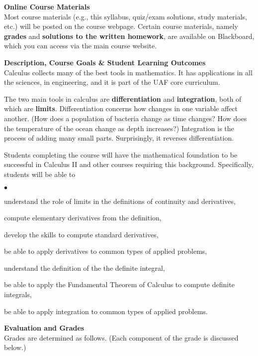 \documentclass[12pt]{article}
\renewcommand{\emph}[1]{\textsf{\textbf{#1}}}
\newcommand{\localhead}[1]{\par\smallskip\textbf{#1}\nobreak\\}%
\def\heading#1{\localhead{\large\emph{#1}}}
\newenvironment{clist}%
{\bgroup\parskip 0pt\begin{list}{$\bullet$}{\partopsep 4pt\topsep 0pt\itemsep -2pt}}%
{\end{list}\egroup}%
\begin{document}
\heading{Online Course Materials}
Most course materials (e.g., this syllabus, quiz/exam solutions, study materials, etc.) will be posted on the course webpage.  Certain course materials, namely \emph{grades} and \emph{solutions to the written homework}, are available on Blackboard, which you can access via the main course website.

\heading{Description, Course Goals \& Student Learning Outcomes}
Calculus collects many of the best tools in mathematics.  It has applications in all the sciences, in engineering, and it is part of the UAF core curriculum.

The two main tools in calculus are \emph{differentiation} and \emph{integration}, both of which are \emph{limits}.  Differentiation concerns how changes in one variable affect another.  (How does a population of bacteria change as time changes?  How does the temperature of the ocean change as depth increases?)  Integration is the process of adding many small parts.  Surprisingly, it reverses differentiation.

Students completing the course will have the mathematical foundation to be successful in Calculus II and other courses
requiring this background.  Specifically, students will be able to

\begin{clist}
\item understand the role of limits in the definitions of continuity and derivatives,
\item compute elementary derivatives from the definition,
\item develop the skills to compute standard derivatives,
\item be able to apply derivatives to common types of applied problems,
\item understand the definition of the the definite integral,
\item be able to apply the Fundamental Theorem of Calculus to
compute definite integrals,
\item be able to apply integration to common types of applied problems.
\end{clist}

\heading{Evaluation and Grades}
Grades are determined as follows.  (Each component of the grade is discussed below.)
 
\end{document}

